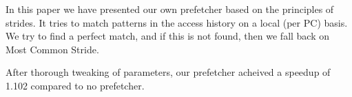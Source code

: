 In this paper we have presented our own prefetcher based on the principles of strides. It tries to match patterns in the access history on a local (per PC) basis. We try to find a perfect match, and if this is not found, then we fall back on Most Common Stride.

After thorough tweaking of parameters, our prefetcher acheived a speedup of 1.102 compared to no prefetcher. 